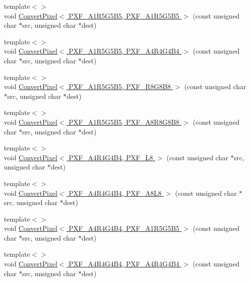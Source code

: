 \begin{DoxyCompactItemize}
{\footnotesize template$<$$>$ }\\void \hyperlink{_convert_pixel_8inl_a59936e71230ee86a43d738e59b520277}{Convert\-Pixel$<$ P\-X\-F\-\_\-\-A1\-R5\-G5\-B5, P\-X\-F\-\_\-\-A1\-R5\-G5\-B5 $>$} (const unsigned char $\ast$src, unsigned char $\ast$dest)
\item 
{\footnotesize template$<$$>$ }\\void \hyperlink{_convert_pixel_8inl_abd2bd032fb975d5e3a51cd13612aa8e6}{Convert\-Pixel$<$ P\-X\-F\-\_\-\-A1\-R5\-G5\-B5, P\-X\-F\-\_\-\-A4\-R4\-G4\-B4 $>$} (const unsigned char $\ast$src, unsigned char $\ast$dest)
\item 
{\footnotesize template$<$$>$ }\\void \hyperlink{_convert_pixel_8inl_a5c4547c1faafe2691ed947d5c4f4bf38}{Convert\-Pixel$<$ P\-X\-F\-\_\-\-A1\-R5\-G5\-B5, P\-X\-F\-\_\-\-R8\-G8\-B8 $>$} (const unsigned char $\ast$src, unsigned char $\ast$dest)
\item 
{\footnotesize template$<$$>$ }\\void \hyperlink{_convert_pixel_8inl_a571b40fd33b03ebefc3e6432b9e435ff}{Convert\-Pixel$<$ P\-X\-F\-\_\-\-A1\-R5\-G5\-B5, P\-X\-F\-\_\-\-A8\-R8\-G8\-B8 $>$} (const unsigned char $\ast$src, unsigned char $\ast$dest)
\item 
{\footnotesize template$<$$>$ }\\void \hyperlink{_convert_pixel_8inl_a44b781519b77cfc50703ab162b9e1f77}{Convert\-Pixel$<$ P\-X\-F\-\_\-\-A4\-R4\-G4\-B4, P\-X\-F\-\_\-\-L8 $>$} (const unsigned char $\ast$src, unsigned char $\ast$dest)
\item 
{\footnotesize template$<$$>$ }\\void \hyperlink{_convert_pixel_8inl_a9ffbf19ed80a8f7498b98fb9a7f46f56}{Convert\-Pixel$<$ P\-X\-F\-\_\-\-A4\-R4\-G4\-B4, P\-X\-F\-\_\-\-A8\-L8 $>$} (const unsigned char $\ast$src, unsigned char $\ast$dest)
\item 
{\footnotesize template$<$$>$ }\\void \hyperlink{_convert_pixel_8inl_ac404510aeb7adc7e52faad3b5c4c76fc}{Convert\-Pixel$<$ P\-X\-F\-\_\-\-A4\-R4\-G4\-B4, P\-X\-F\-\_\-\-A1\-R5\-G5\-B5 $>$} (const unsigned char $\ast$src, unsigned char $\ast$dest)
\item 
{\footnotesize template$<$$>$ }\\void \hyperlink{_convert_pixel_8inl_ad80f32e7ed62147a40e08a77c3bb02e4}{Convert\-Pixel$<$ P\-X\-F\-\_\-\-A4\-R4\-G4\-B4, P\-X\-F\-\_\-\-A4\-R4\-G4\-B4 $>$} (const unsigned char $\ast$src, unsigned char $\ast$dest)
\item 

\end{DoxyCompactItemize}
